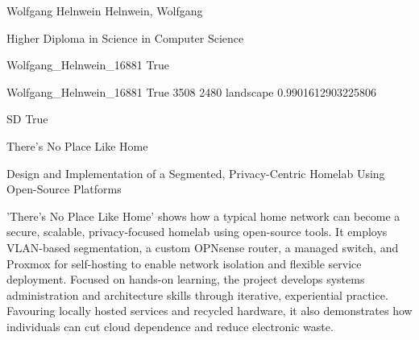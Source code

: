 \documentclass[twoside]{report}
\begin{document}
\begingroup{}\relax



\def\Key{Wolfgang_Helnwein_16881}

{Wolfgang Helnwein}
{Helnwein, Wolfgang}

{Higher Diploma in Science in Computer Science}

{Wolfgang_Helnwein_16881}
{True}

{Wolfgang_Helnwein_16881}
{True}
{3508}
{2480}
{landscape}
{0.9901612903225806}

{SD}
{True}

{There's No Place Like Home}

{Design and Implementation of a Segmented, Privacy-Centric Homelab Using Open-Source Platforms}

{'There's No Place Like Home' shows how a typical home network can become a secure, scalable, privacy-focused homelab using open-source tools. It employs VLAN-based segmentation, a custom OPNsense router, a managed switch, and Proxmox for self-hosting to enable network isolation and flexible service deployment. Focused on hands-on learning, the project develops systems administration and architecture skills through iterative, experiential practice. Favouring locally hosted services and recycled hardware, it also demonstrates how individuals can cut cloud dependence and reduce electronic waste.}
\end{document}
